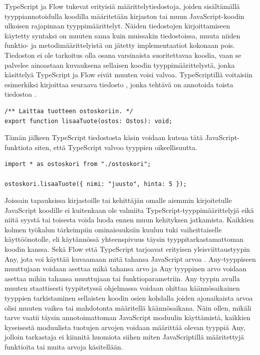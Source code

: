 TypeScript ja Flow tukevat erityisiä määrittelytiedostoja, joiden sisältämällä
tyyppiannotoidulla koodilla määritetään kirjaston tai muun JavaScript-koodin
ulkoisen rajapinnan tyyppimäärittelyt. Näiden tiedostojen kirjoittamiseen
käytetty syntaksi on muuten sama kuin muissakin tiedostoissa, muuta niiden funktio- ja
metodimäärittelyistä on jätetty implementaatiot kokonaan pois. Tiedoston ei
ole tarkoitus olla osana varsinaista suoritettavaa koodia, vaan se palvelee
ainoastaan kuvauksena sellaisen koodin tyyppimäärittelystä, jonka käsittelyä
TypeScript ja Flow eivät muuten voisi valvoa. TypeScriptillä voitaisiin
esimerkiksi kirjoittaa seuraava tiedosto , jonka
tehtävä on annotoida toista tiedostoa .

\begin{minipage}{\linewidth}
\begin{lstlisting}[caption={Esimerkki TypeScript määrittelytiedostosta ostoskori.d.ts}]
/** Laittaa tuotteen ostoskoriin. */
export function lisaaTuote(ostos: Ostos): void;
\end{lstlisting}
\end{minipage}
Tämän jälkeen TypeScript tiedostosta käsin voidaan kutsua tätä
JavaScript-funktiota siten, että TypeScript valvoo
tyyppien oikeellisuutta.

\begin{minipage}{\linewidth}
\begin{lstlisting}[caption={JavaScript-koodin kutsuminen TypeScript tiedostosta tuotesivu.ts}]
import * as ostoskori from "./ostoskori";

ostoskori.lisaaTuote({ nimi: "juusto", hinta: 5 });
\end{lstlisting}
\end{minipage}

Joissain tapauksissa kirjastoille tai kehittäjän omalle aiemmin kirjoitetulle
JavaScript koodille ei kuitenkaan ole valmiita TypeScript-tyyppimäärittelyjä
eikä niitä syystä tai toisesta voida luoda ennen muun kehityksen jatkamista.
Kaikkien kolmen työkalun tärkeimpiin ominaisuuksiin kuuluu tuki vaiheittaiselle
käyttöönotolle, eli käytännössä yhteenspivuus täysin tyyppitarkastamattoman
koodin kanssa. Sekä Flow että TypeScript tarjoavat erityisen
yleisviittaustyypin Any, jota voi käyttää kuvaamaan mitä tahansa JavaScript
arvoa \cite{TypeScriptSpec}. Any-tyyppiseen muuttujaan voidaan asettaa mikä
tahansa arvo ja Any tyyppinen arvo voidaan asettaa mihin tahansa muuttujaan
tai funktioparametriin. Any tyypin avulla muuten staattisesti tyypitetyssä
ohjelmassa voidaan ohittaa käännösaikainen tyyppien tarkistaminen sellaisten
koodin osien kohdalla joiden ajonaikaista arvoa olisi muuten vaikea tai
mahdotonta määritellä käännösaikana. Näin ollen, mikäli tarve vaatii täysin
annotoimattoman JavaScript moduulin käyttämistä, kaikkien kyseisestä moduulista
tuotujen arvojen voidaan määrittää olevan tyyppiä Any, jolloin tarkastaja ei
kiinnitä huomiota siihen miten JavaScriptillä määritettyjä funktioita tai
muita arvoja käsitellään.